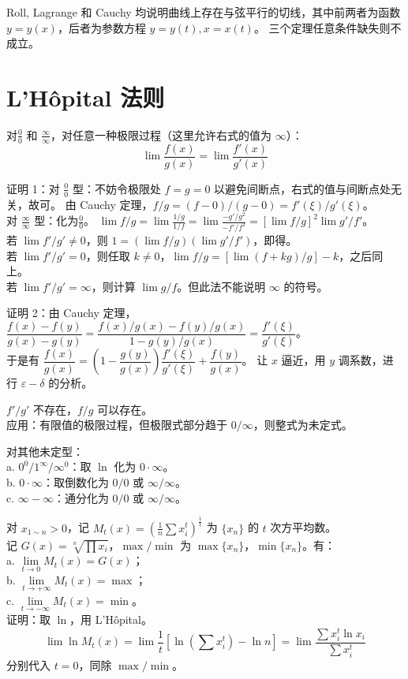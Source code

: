 \documentclass[12pt, a4paper, UTF8, openany]{ctexbook}
\newcommand{\eps}{\varepsilon}
\begin{document}
    Roll, Lagrange 和 Cauchy 均说明曲线上存在与弦平行的切线，其中前两者为函数 $y = y(x)$，后者为参数方程 $y = y(t), x = x(t)$。
    三个定理任意条件缺失则不成立。

    \section{L'Hôpital 法则}
    对$\frac{0}{0}$ 和 $\frac{\infty}{\infty}$，对任意一种极限过程（这里允许右式的值为 $\infty$）：
    $$\lim \frac{f(x)}{g(x)} = \lim \frac{f'(x)}{g'(x)}$$
    
    证明 1：对 $\frac{0}{0}$ 型：不妨令极限处 $f = g = 0$ 以避免间断点，右式的值与间断点处无关，故可。
    由 Cauchy 定理，$f / g = (f - 0)/(g - 0) = f'(\xi) / g'(\xi)$。\\
    对 $\frac{\infty}{\infty}$ 型：化为$\frac{0}{0}$。
    $\lim f / g = \lim \frac{1 / g}{1 / f} = \lim \frac{-g'/g^2}{-f'/f^2} = \left[\lim f / g\right]^2 \lim g' / f'$。\\
    若 $\lim f'/g' \neq 0$，则 $1 = (\lim f / g)(\lim g' / f')$，即得。\\
    若 $\lim f'/g' = 0$，则任取 $k \neq 0$，$\lim f / g = \left[\lim (f + kg) / g\right] - k$，之后同上。\\
    若 $\lim f'/g' = \infty$，则计算 $\lim g / f$。但此法不能说明 $\infty$ 的符号。

    证明 2：由 Cauchy 定理，$\dfrac{f(x) - f(y)}{g(x) - g(y)} = \dfrac{f(x)/g(x) - f(y)/g(x)}{1 - g(y)/g(x)} 
    = \dfrac{f'(\xi)}{g'(\xi)}$。\\
    于是有 $\dfrac{f(x)}{g(x)} = (1 - \dfrac{g(y)}{g(x)})\dfrac{f'(\xi)}{g'(\xi)} + \dfrac{f(y)}{g(x)}$。
    让 $x$ 逼近，用 $y$ 调系数，进行 $\eps-\delta$ 的分析。

    $f' / g'$ 不存在，$f / g$ 可以存在。\\
    {\heiti 应用}：有限值的极限过程，但极限式部分趋于 $0/\infty$，则整式为未定式。

    对其他未定型：\\
    a. $0^0 / 1^{\infty} / \infty^0$：取 $\ln$ 化为 $0 \cdot \infty$。\\
    b. $0 \cdot \infty$：取倒数化为 $0 / 0$ 或 $\infty / \infty$。\\
    c. $\infty - \infty$：通分化为 $0 / 0$ 或 $\infty / \infty$。

    对 $x_{1 \sim n} > 0$，记 $M_t(x) = \left(\frac{1}{n}\sum x_i^t\right) ^{\frac{1}{t}}$ 为 $\{x_n\}$ 的 $t$ 次方平均数。\\
    记 $G(x) = \sqrt[n]{\prod x_i}$，$\max/\min$ 为 $\max\{x_n\}$，$\min\{x_n\}$。有：\\
    a. $\lim\limits_{t \to 0} M_t(x) = G(x)$；\\
    b. $\lim\limits_{t \to +\infty} M_t(x) = \max$；\\
    c. $\lim\limits_{t \to -\infty} M_t(x) = \min$。\\
    证明：取 $\ln$，用 L'Hôpital。
    $$\lim \ln M_t(x) = \lim \frac{1}{t}\left[\ln\left(\sum x_i^t\right) - \ln n\right] 
    = \lim \frac{\sum x_i^t \ln x_i}{\sum x_i^t}$$
    分别代入 $t = 0$，同除 $\max/\min$。
\end{document}
